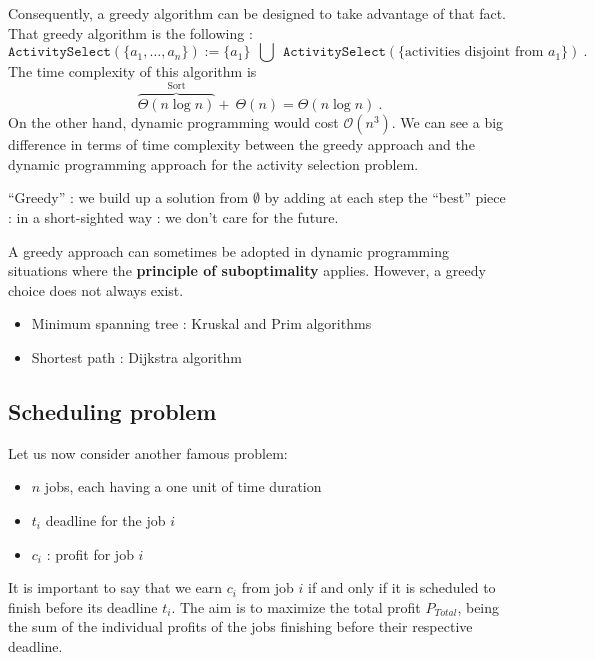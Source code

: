 Consequently, a greedy algorithm can be designed to take advantage of that fact. That greedy algorithm is the following :
\begin{equation*}
\texttt{ActivitySelect}(\{ a_1,\ldots,a_n\}) := \{a_1 \} \: \: \bigcup \: \: \texttt{ActivitySelect}(\{\text{activities disjoint from  } a_1\}) \: .
\end{equation*}
The time complexity of this algorithm is 
\begin{equation*}
\overbrace{\Theta(n \log n)}^{\text{Sort}} + \: \Theta(n) = \Theta(n \log n) \: .
\end{equation*}
On the other hand, dynamic programming would cost $\mathcal{O}(n^3)$. We can see a big difference in terms of time complexity between the greedy approach and the dynamic programming approach for the activity selection problem.

“Greedy” : we build up a solution from $\emptyset$ by adding at each step the “best” piece : in a short-sighted way : we don’t care for the future.

A greedy approach can sometimes be adopted in dynamic programming situations where the \textbf{principle of suboptimality} applies. However, a greedy choice does not always exist. \\


\begin{tcolorbox}[title=\textbf{Other examples of greedy algorithms}]
\begin{itemize}
 \item Minimum spanning tree : Kruskal and Prim algorithms
 \item Shortest path : Dijkstra algorithm
\end{itemize}
\end{tcolorbox}

\subsection{Scheduling problem}
Let us now consider another famous problem:

\begin{tcolorbox}[title=\textbf{Scheduling problem}]
\begin{itemize}
 \item $n$ jobs, each having a one unit of time duration
 \item $t_i$ deadline for the job $i$
 \item $c_i$ : profit for job $i$
\end{itemize}
\end{tcolorbox}
It is important to say that we earn $c_i$ from job $i$ if and only if it is scheduled to finish before its deadline $t_i$. The aim is to maximize the total profit $P_{Total}$, being the sum of the individual profits of the jobs finishing before their respective deadline.


